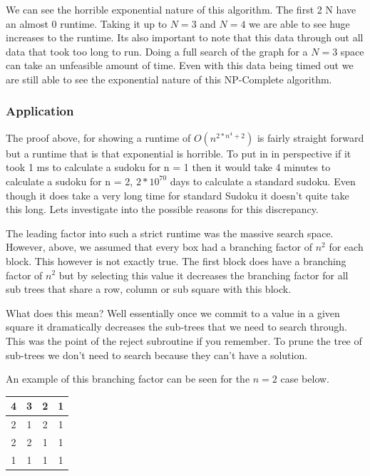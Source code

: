 \documentclass{sig-alternate}
\begin{document}
We can see the horrible exponential nature of this algorithm. The first 2 N have an almost 0 runtime. Taking it up to $N=3$ and $N=4$ we are able to see huge increases to the runtime. Its also important to note that this data through out all data that took too long to run. Doing a full search of the graph for a $N=3$ space can take an unfeasible amount of time. Even with this data being timed out we are still able to see the exponential nature of this NP-Complete algorithm.

\subsubsection{Application}
The proof above, for showing a runtime of $O(n^{2*n^4 + 2})$ is fairly straight forward but a runtime that is that exponential is horrible. To put in in perspective if it took 1 ms to calculate a sudoku for n = 1 then it would take 4 minutes to calculate a sudoku for n = 2, $2*10^70$ days to calculate a standard sudoku. Even though it does take a very long time for standard Sudoku it doesn't quite take this long. Lets investigate into the possible reasons for this discrepancy. 

The leading factor into such a strict runtime was the massive search space. However, above, we assumed that every box had a branching factor of $n^2$ for each block. This however is not exactly true. The first block does have a branching factor of $n^2$ but by selecting this value it decreases the branching factor for all sub trees that share a row, column or sub square with this block. 

What does this mean? Well essentially once we commit to a value in a given square it dramatically decreases the sub-trees that we need to search through. This was the point of the reject subroutine if you remember. To prune the tree of sub-trees we don't need to search because they can't have a solution. 

An example of this branching factor can be seen for the $n=2$ case below. 

\begin{center}
  \begin{tabular}{ | c | c | c | c | }
    \hline
    	4 & 3 & 2 & 1 \\ \hline
    	2 & 1 & 2 & 1 \\ \hline
    	2 & 2 & 1 & 1 \\ \hline
       	1 & 1 & 1 & 1 \\
    \hline
  \end{tabular}
\end{center}
\end{document}
